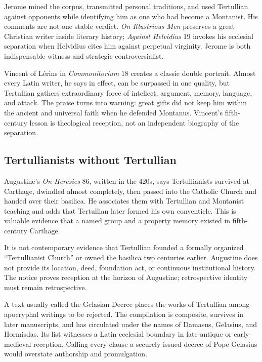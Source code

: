 Jerome mined the corpus, transmitted personal traditions, and used Tertullian
against opponents while identifying him as one who had become a Montanist. His
comments are not one stable verdict. \emph{On Illustrious Men} preserves a
great Christian writer inside literary history; \emph{Against Helvidius} 19
invokes his ecclesial separation when Helvidius cites him against perpetual
virginity. Jerome is both indispensable witness and strategic controversialist.

Vincent of L\'erins in \emph{Commonitorium} 18 creates a classic double
portrait. Almost every Latin writer, he says in effect, can be surpassed in one
quality, but Tertullian gathers extraordinary force of intellect, argument,
memory, language, and attack. The praise turns into warning: great gifts did
not keep him within the ancient and universal faith when he defended Montanus.
Vincent's fifth-century lesson is theological reception, not an independent
biography of the separation.

\subsection{Tertullianists without Tertullian}

Augustine's \emph{On Heresies} 86, written in the 420s, says Tertullianists
survived at Carthage, dwindled almost completely, then passed into the Catholic
Church and handed over their basilica. He associates them with Tertullian and
Montanist teaching and adds that Tertullian later formed his own conventicle.
This is valuable evidence that a named group and a property memory existed in
fifth-century Carthage.

It is not contemporary evidence that Tertullian founded a formally organized
``Tertullianist Church'' or owned the basilica two centuries earlier. Augustine
does not provide its location, deed, foundation act, or continuous institutional
history. The notice proves reception at the horizon of Augustine; retrospective
identity must remain retrospective.

A text usually called the Gelasian Decree places the works of Tertullian among
apocryphal writings to be rejected. The compilation is composite, survives in
later manuscripts, and has circulated under the names of Damasus, Gelasius, and
Hormisdas. Its list witnesses a Latin ecclesial boundary in late-antique or
early-medieval reception. Calling every clause a securely issued decree of Pope
Gelasius would overstate authorship and promulgation.

